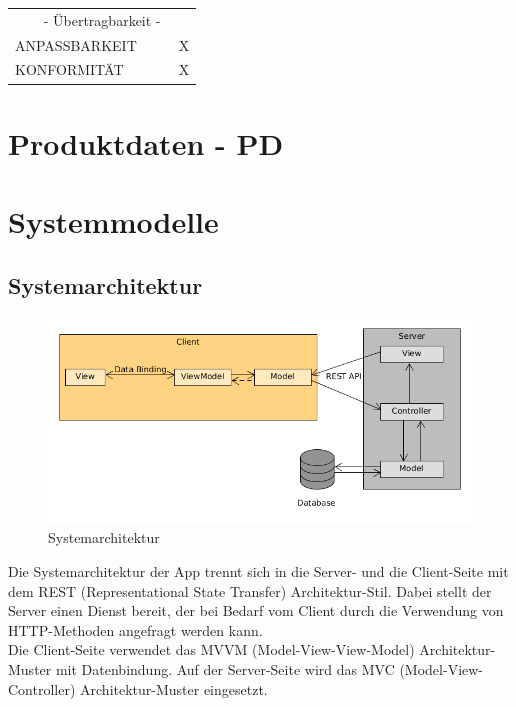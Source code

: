 \documentclass[a4paper]{scrreprt}
\begin{document}
\begin{table}[h!]
\begin{tabular}{llll}
    			\multicolumn{4}{c}{- Übertragbarkeit -}\\
    			ANPASSBARKEIT                                &                                        &                                   &        \hspace{6mm}               X                \\
    			KONFORMITÄT                                  &                                        &                                   &        \hspace{6mm}               X             \\  
    		\end{tabular}
    	\end{table}

    \chapter{Produktdaten - PD}
    
		
    
    \chapter{Systemmodelle}
    
    	\section{Systemarchitektur}
    	
    	\begin{figure}[H]
    		\centering
    		\includegraphics[scale = .6]{systemarchitektur.png}
    		\caption{Systemarchitektur}
    	\end{figure}
    
    	Die Systemarchitektur der App trennt sich in die Server- und die Client-Seite mit dem REST (Representational State Transfer) Architektur-Stil. Dabei stellt der Server einen Dienst bereit, der bei Bedarf vom Client durch die Verwendung von HTTP-Methoden angefragt werden kann. \\
    	Die Client-Seite verwendet das MVVM (Model-View-View-Model) Architektur-Muster mit Datenbindung. Auf der Server-Seite wird das MVC (Model-View-Controller) Architektur-Muster eingesetzt.
    	
\end{document}
